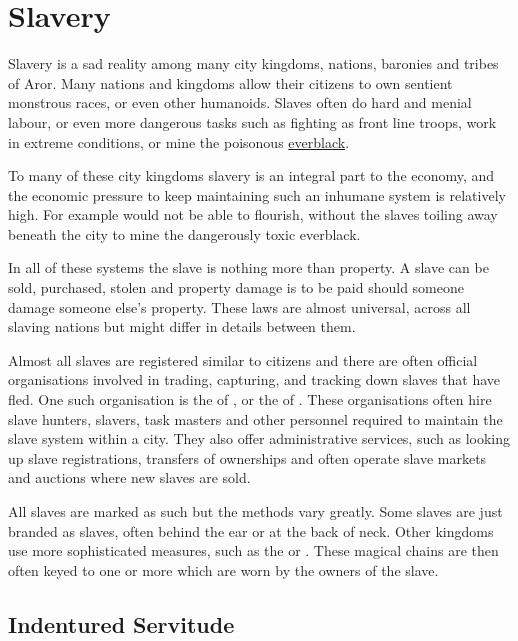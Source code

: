 \section{Slavery}
\label{sec:Slavery}

Slavery is a sad reality among many city kingdoms, nations, baronies and
tribes of Aror. Many nations and kingdoms allow their citizens to own
sentient monstrous races, or even other humanoids. Slaves often do
hard and menial labour, or even more dangerous tasks such as fighting
as front line troops, work in extreme conditions, or mine the poisonous
\hyperref[sec:Everblack]{everblack}.

To many of these city kingdoms slavery is an integral part to the economy,
and the economic pressure to keep maintaining such an inhumane system
is relatively high. For example  would not be able
to flourish, without the slaves toiling away beneath the city to mine
the dangerously toxic everblack.

In all of these systems the slave is nothing more than property. A slave
can be sold, purchased, stolen and property damage is to be paid should
someone damage someone else's property. These laws are almost universal,
across all slaving nations but might differ in details between them.

Almost all slaves are registered similar to citizens and there are often
official organisations involved in trading, capturing, and tracking down
slaves that have fled. One such organisation is the  of , or the  of
. These organisations often hire slave hunters,
slavers, task masters and other personnel required to maintain the slave
system within a city. They also offer administrative services, such as looking
up slave registrations, transfers of ownerships and often operate slave
markets and auctions where new slaves are sold.

All slaves are marked as such but the methods vary greatly. Some slaves
are just branded as slaves, often behind the ear or at the back of neck.
Other kingdoms use more sophisticated measures, such as the
 or . These magical
chains are then often keyed to one or more  which
are worn by the owners of the slave.

\subsection{Indentured Servitude}
\label{sec:Indentured Servitude}

